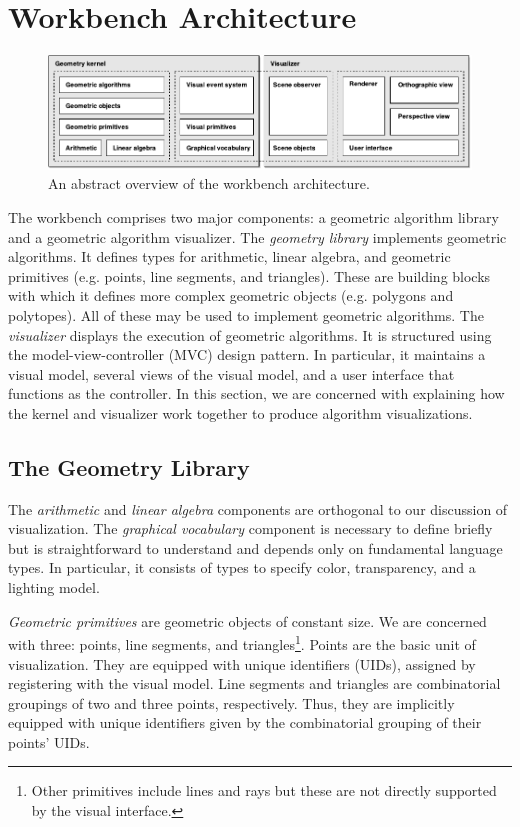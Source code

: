 
\FloatBarrier
\section{Workbench Architecture}

\begin{figure}[htb]
\centering
\includegraphics[width=\textwidth]{figures/components-uml-4} 
\caption{An abstract overview of the workbench architecture.}
\label{fig:components} 
\end{figure}

The workbench comprises two major components: a geometric algorithm library and
a geometric algorithm visualizer. The \emph{geometry library} implements
geometric algorithms. It defines types for arithmetic, linear algebra, and
geometric primitives (e.g. points, line segments, and triangles). These are
building blocks with which it defines more complex geometric objects (e.g.
polygons and polytopes). All of these may be used to implement geometric
algorithms. The \emph{visualizer} displays the execution of geometric
algorithms. It is structured using the model-view-controller (MVC) design
pattern. In particular, it maintains a visual model, several views of the visual
model, and a user interface that functions as the controller. In this section,
we are concerned with explaining how the kernel and visualizer work together to
produce algorithm visualizations.

\FloatBarrier
\subsection{The Geometry Library}

The \emph{arithmetic} and \emph{linear algebra} components are orthogonal to our
discussion of visualization. The \emph{graphical vocabulary} component is
necessary to define briefly but is straightforward to understand and depends
only on fundamental language types. In particular, it consists of types to
specify color, transparency, and a lighting model.

\emph{Geometric primitives} are geometric objects of constant size. We are
concerned with three: points, line segments, and triangles\footnote{Other
primitives include lines and rays but these are not directly supported by the
visual interface.}. Points are the basic unit of visualization. They are
equipped with unique identifiers (UIDs), assigned by registering with the visual
model. Line segments and triangles are combinatorial groupings of two and three
points, respectively. Thus, they are implicitly equipped with unique identifiers
given by the combinatorial grouping of their points' UIDs.

